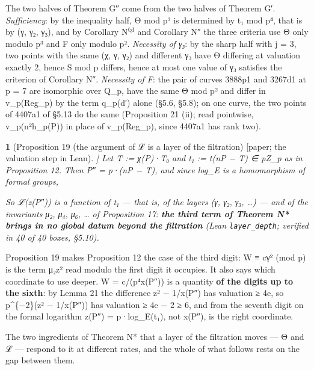 \documentclass[11pt,a4paper]{article}
\theoremstyle{named}
\newtheorem*{namedthm}{}
\newcommand{\dispf}[1]{\par\smallskip{\centering #1\par}\smallskip}
\begin{document}
The two halves of Theorem G″ come from the two halves of Theorem G′. \textit{Sufficiency}: by the inequality half, Θ mod p³ is determined by t₁ mod p⁴, that is by (γ, γ₂, γ₃), and by Corollary N⁽³⁾ and Corollary N″ the three criteria use Θ only modulo p³ and F only modulo p². \textit{Necessity of γ₃}: by the sharp half with j = 3, two points with the same (χ, γ, γ₂) and different γ₃ have Θ differing at valuation exactly 2, hence S mod p differs, hence at most one value of γ₃ satisfies the criterion of Corollary N″. \textit{Necessity of F}: the pair of curves 3888p1 and 3267d1 at p = 7 are isomorphic over Q\_p, have the same Θ mod p² and differ in v\_p(Reg\_p) by the term q\_p(d′) alone (§5.6, §5.8); on one curve, the two points of 4407a1 of §5.13 do the same (Proposition 21 (ii); read pointwise, v\_p(n²h\_p(P)) in place of v\_p(Reg\_p), since 4407a1 has rank two).

\begin{namedthm}[Proposition 19 (the argument of ℒ is a layer of the filtration) [paper; the valuation step in Lean]]
Let T := χ(P)·T₀ and t₁ := t(nP − T) ∈ pZ\_p as in Proposition 12. Then P″ = p·(nP − T), and since log\_E is a homomorphism of formal groups,
\dispf{\textbf{z(P″) = p·log\_E(t₁)},  hence  \textbf{e = 1 + v\_p(t₁)}.}
So ℒ(z(P″)) is a function of t₁ — that is, of the layers (γ, γ₂, γ₃, …) — and of the invariants μ₂, μ₄, μ₆, … of Proposition 17: \textbf{the third term of Theorem N* brings in no global datum beyond the filtration} (Lean \texttt{layer\_\allowbreak{}depth}; verified in 40 of 40 boxes, §5.10).
\end{namedthm}

Proposition 19 makes Proposition 12 the case of the third digit: W ≡ cγ² (mod p) is the term μ₂z² read modulo the first digit it occupies. It also says which coordinate to use deeper. W = c/(p⁴x(P″)) is a quantity \textbf{of the digits up to the sixth}: by Lemma 21 the difference z² − 1/x(P″) has valuation ≥ 4e, so p\textasciicircum{}\{−2\}(z² − 1/x(P″)) has valuation ≥ 4e − 2 ≥ 6, and from the seventh digit on the formal logarithm z(P″) = p·log\_E(t₁), not x(P″), is the right coordinate.

The two ingredients of Theorem N* that a layer of the filtration moves — Θ and ℒ — respond to it at different rates, and the whole of what follows rests on the gap between them.
\end{document}
